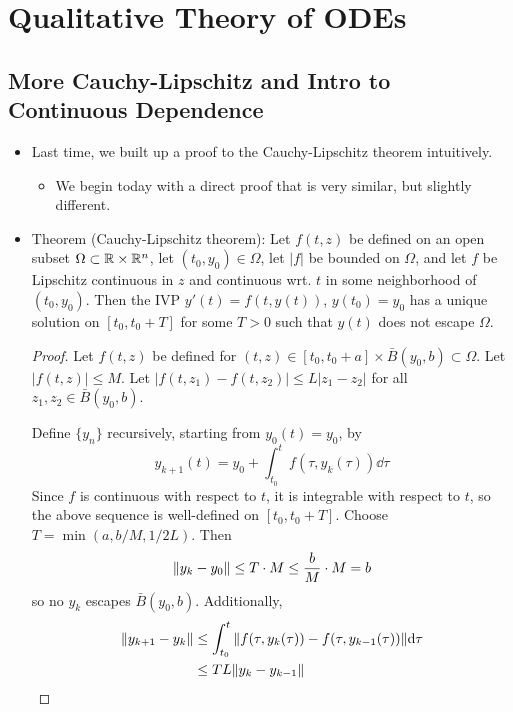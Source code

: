 \documentclass[../notes.tex]{subfiles}
\begin{document}
\chapter{Qualitative Theory of ODEs}
\section{More Cauchy-Lipschitz and Intro to Continuous Dependence}
\begin{itemize}
    \item {}Last time, we built up a proof to the Cauchy-Lipschitz theorem intuitively.
    \begin{itemize}
        \item We begin today with a direct proof that is very similar, but slightly different.
    \end{itemize}
    \item Theorem (Cauchy-Lipschitz theorem): Let $f(t,z)$ be defined on an open subset $\Omega\subset\mathbb{R}\times\mathbb{R}^n$, let $(t_0,y_0)\in\Omega$, let $|f|$ be bounded on $\Omega$, and let $f$ be Lipschitz continuous in $z$ and continuous wrt. $t$ in some neighborhood of $(t_0,y_0)$. Then the IVP $y'(t)=f(t,y(t))$, $y(t_0)=y_0$ has a unique solution on $[t_0,t_0+T]$ for some $T>0$ such that $y(t)$ does not escape $\Omega$.
    \begin{proof}
        Let $f(t,z)$ be defined for $(t,z)\in[t_0,t_0+a]\times\bar{B}(y_0,b)\subset\Omega$. Let $|f(t,z)|\leq M$. Let $|f(t,z_1)-f(t,z_2)|\leq L|z_1-z_2|$ for all $z_1,z_2\in\bar{B}(y_0,b)$.\par
        Define $\{y_n\}$ recursively, starting from $y_0(t)=y_0$, by
        \begin{equation*}
            y_{k+1}(t) = y_0+\int_{t_0}^tf(\tau,y_k(\tau))\dd\tau
        \end{equation*}
        Since $f$ is continuous with respect to $t$, it is integrable with respect to $t$, so the above sequence is well-defined on $[t_0,t_0+T]$. Choose $T=\min(a,b/M,1/2L)$. Then
        \begin{equation*}
            \norm{y_k-y_0} \leq T\cdot M
            \leq \frac{b}{M}\cdot M
            = b
        \end{equation*}
        so no $y_k$ escapes $\bar{B}(y_0,b)$. Additionally,
        \begin{align*}
            \norm{y_{k+1}-y_k} &\leq \int_{t_0}^t\norm{f(\tau,y_k(\tau))-f(\tau,y_{k-1}(\tau))}\dd\tau\\
            &\leq TL\norm{y_k-y_{k-1}}\\

\end{align*}
\end{proof}
\end{itemize}
\end{document}
